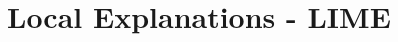 \documentclass[11pt,compress,t,notes=noshow, aspectratio=169, xcolor=table]{beamer}
\begin{document}
% 
% 
% 
% 
%
% 
% 
% 
% 
% 
% 
%
% 
% 
% 
%
% 

% 
% 
\section{Local Explanations - LIME}


% 
% 
\end{document}
